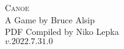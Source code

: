 



\begin{center}
    \Huge \textsc{Canoe}\\
    \LARGE A Game by Bruce Alsip\\
    \large PDF Compiled by Niko Lepka\\
    $v.2022.7.31.0$
\end{center}










